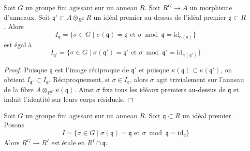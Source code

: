 \begin{lemma}
\label{lemma-inertia-base-change}
Soit $G$ un groupe fini agissant sur un anneau $R$. Soit $R^G \to A$ un morphisme
d'anneaux. Soit $\mathfrak q' \subset A \otimes_{R^G} R$ un idéal premier au-dessus
de l'idéal premier $\mathfrak q \subset R$. Alors
$$
I_\mathfrak q = \{\sigma \in G \mid
\sigma(\mathfrak q) = \mathfrak q\text{ et }
\sigma \bmod \mathfrak q = \text{id}_{\kappa(\mathfrak q)}\}
$$
est égal à
$$
I_{\mathfrak q'} = \{\sigma \in G \mid
\sigma(\mathfrak q') = \mathfrak q'\text{ et }
\sigma \bmod \mathfrak q' = \text{id}_{\kappa(\mathfrak q')}\}
$$
\end{lemma}

\begin{proof}
Puisque $\mathfrak q$ est l'image réciproque de $\mathfrak q'$
et puisque $\kappa(\mathfrak q) \subset \kappa(\mathfrak q')$,
on obtient $I_{\mathfrak q'} \subset I_\mathfrak q$.
Réciproquement, si $\sigma \in I_\mathfrak q$, alors $\sigma$
agit trivialement sur l'anneau de la fibre $A \otimes_{R^G} \kappa(\mathfrak q)$.
Ainsi $\sigma$ fixe tous les idéaux premiers au-dessus de $\mathfrak q$
et induit l'identité sur leurs corps résiduels.
\end{proof}

\begin{lemma}
\label{lemma-inertia-invariants-etale}
Soit $G$ un groupe fini agissant sur un anneau $R$. Soit $\mathfrak q \subset R$
un idéal premier. Posons
$$
I = \{\sigma \in G \mid \sigma(\mathfrak q) = \mathfrak q
\text{ et } \sigma \bmod \mathfrak q = \text{id}_\mathfrak q\}
$$
Alors $R^G \to R^I$ est étale en $R^I \cap \mathfrak q$.
\end{lemma}

